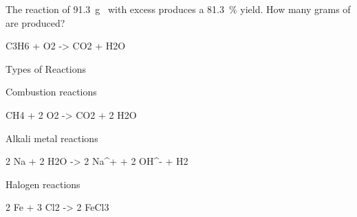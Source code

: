 \documentclass[handout]{beamer}
\begin{document}
\begin{onyourown}[20em]
	The reaction of \SI{91.3}{\gram}~ with excess  produces
	a \SI{81.3}{\percent} yield. How many grams of  are produced?
	\begin{reaction*}
		C3H6\gas{} + O2\gas{} -> CO2\gas{} + H2O\lqd{}
	\end{reaction*}
\end{onyourown}

%
%
%
%
%
%
%
%
%
%
%
%
%
%

\begin{frame}{Types of Reactions}
	\begin{block}{Combustion reactions}
		\begin{reaction*}
			CH4\gas{} + 2 O2\gas{} -> CO2\gas{} + 2
			H2O\gas{}
		\end{reaction*}
	\end{block}

	\begin{block}{Alkali metal reactions}
		\begin{reaction*}
			2 Na\sld{} + 2 H2O\lqd{} -> 2
			Na^{+}\aq{} + 2 OH^{-}\aq{} + H2\gas{}
		\end{reaction*}
	\end{block}

	\begin{block}{Halogen reactions}
		\begin{reaction*}
			2 Fe\sld{} + 3 Cl2\gas{} -> 2
			FeCl3\sld{}
		\end{reaction*}
	\end{block}
\end{frame}
\end{document}
